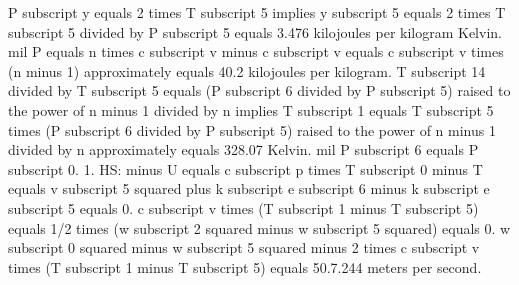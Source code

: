P subscript y equals 2 times T subscript 5 implies y subscript 5 equals 2 times T subscript 5 divided by P subscript 5 equals 3.476 kilojoules per kilogram Kelvin.
mil P equals n times c subscript v minus c subscript v equals c subscript v times (n minus 1) approximately equals 40.2 kilojoules per kilogram.
T subscript 14 divided by T subscript 5 equals (P subscript 6 divided by P subscript 5) raised to the power of n minus 1 divided by n implies T subscript 1 equals T subscript 5 times (P subscript 6 divided by P subscript 5) raised to the power of n minus 1 divided by n approximately equals 328.07 Kelvin.
mil P subscript 6 equals P subscript 0.
1. HS: minus U equals c subscript p times T subscript 0 minus T equals v subscript 5 squared plus k subscript e subscript 6 minus k subscript e subscript 5 equals 0.
c subscript v times (T subscript 1 minus T subscript 5) equals 1/2 times (w subscript 2 squared minus w subscript 5 squared) equals 0.
w subscript 0 squared minus w subscript 5 squared minus 2 times c subscript v times (T subscript 1 minus T subscript 5) equals 50.7.244 meters per second.